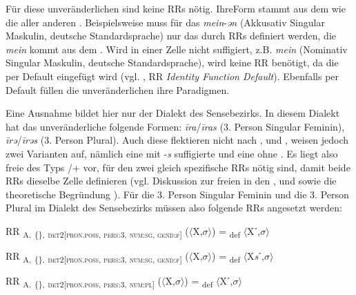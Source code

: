 Für diese unveränderlichen  sind keine RRs nötig. Ihre\linebreak Form stammt aus dem  wie die  aller anderen . Beispielsweise muss für das  \textit{mein}-\textit{ən} (Akkusativ Singular Maskulin, deutsche Standardsprache) nur das  durch RRs definiert werden, die  \textit{mein} kommt aus dem . Wird in einer Zelle nicht suffigiert, z.B. \textit{mein} (Nominativ Singular Maskulin, deutsche Standardsprache), wird keine RR benötigt, da die  per Default eingefügt wird (vgl. , RR \textit{Identity Function Default}). Ebenfalls per Default füllen die unveränderlichen  ihre Paradigmen.

Eine Ausnahme bildet hier nur der Dialekt des Sensebezirks. In diesem Dialekt hat das unveränderliche  folgende Formen: \textit{\=ira}/\textit{\=iras} (3. Person Singular Feminin), \textit{\=irə}/\textit{\=irəs} (3. Person Plural). Auch diese flektieren nicht nach ,  und , weisen jedoch zwei Varianten auf, nämlich eine mit -\textit{s} suffigierte und eine ohne . Es liegt also freie  des Typs /+ vor, für den zwei gleich spezifische RRs nötig sind, damit beide RRs dieselbe Zelle definieren (vgl. Diskussion zur freien  in den  ,   und   sowie die theoretische Begründung ). Für die 3. Person Singular Feminin und die 3. Person Plural im Dialekt des Sensebezirks müssen also folgende RRs angesetzt werden:\largerpage

\ea%
\label{ex:key:151}
 RR \textsubscript{A,} \textsubscript{\{\},} \textsubscript{\textsc{det2[pron.poss}, \textsc{pers:3}, \textsc{num:sg}, \textsc{gend:f}]} ($\langle$X,$\sigma$$\rangle$) = \textsubscript{def} $\langle$Xˊ,$\sigma$$\rangle$
\z

\ea%
\label{ex:key:152}
 RR \textsubscript{A,} \textsubscript{\{\},} \textsubscript{\textsc{det2[pron.poss}, \textsc{pers:3}, \textsc{num:sg}, \textsc{gend:f}]} ($\langle$X,$\sigma$$\rangle$) = \textsubscript{def} $\langle$X\textit{s}ˊ,$\sigma$$\rangle$
\z

\ea%
\label{ex:key:153}
 RR \textsubscript{A,} \textsubscript{\{\},} \textsubscript{\textsc{det2[pron.poss}, \textsc{pers:3}, \textsc{num:pl}]} ($\langle$X,$\sigma$$\rangle$) = \textsubscript{def} $\langle$Xˊ,$\sigma$$\rangle$
\z

